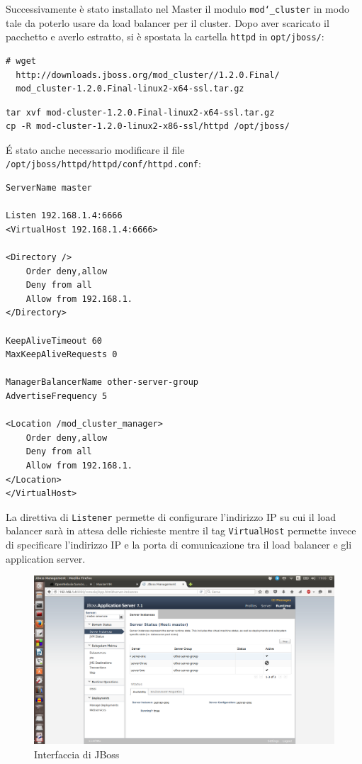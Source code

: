 \documentclass[twoside]{article}
\begin{document}
Successivamente è stato installato nel Master il modulo \texttt{mod\char`_cluster} in modo tale da poterlo
usare da load balancer per il cluster. Dopo aver scaricato il pacchetto e averlo estratto,
si è spostata la cartella \texttt{httpd} in \texttt{opt/jboss/}:
\begin{lstlisting}[frame=trBL]
# wget
  http://downloads.jboss.org/mod_cluster//1.2.0.Final/
  mod_cluster-1.2.0.Final-linux2-x64-ssl.tar.gz
\end{lstlisting}
\begin{lstlisting}[frame=trBL]
tar xvf mod-cluster-1.2.0.Final-linux2-x64-ssl.tar.gz
cp -R mod-cluster-1.2.0-linux2-x86-ssl/httpd /opt/jboss/
\end{lstlisting}
\'{E} stato anche necessario modificare il file \texttt{/opt/jboss/httpd/httpd/conf/httpd.conf}:
\begin{lstlisting}[frame=trBL]
ServerName master

Listen 192.168.1.4:6666
<VirtualHost 192.168.1.4:6666>

<Directory />
	Order deny,allow
	Deny from all
	Allow from 192.168.1.
</Directory>

KeepAliveTimeout 60
MaxKeepAliveRequests 0

ManagerBalancerName other-server-group
AdvertiseFrequency 5

<Location /mod_cluster_manager>
	Order deny,allow
	Deny from all
	Allow from 192.168.1.
</Location>
</VirtualHost>
\end{lstlisting}
La direttiva di \texttt{Listener} permette di configurare l'indirizzo IP su cui il load balancer sarà
in attesa delle richieste mentre il tag \texttt{VirtualHost} permette invece di specificare l’indirizzo IP e
la porta di comunicazione tra il load balancer e gli application server.

\begin{figure}[!bp]
\centering
\includegraphics[width=13cm]{immagine1.png}
\caption{Interfaccia di JBoss}\label{fig:1}
\end{figure}
\end{document}
